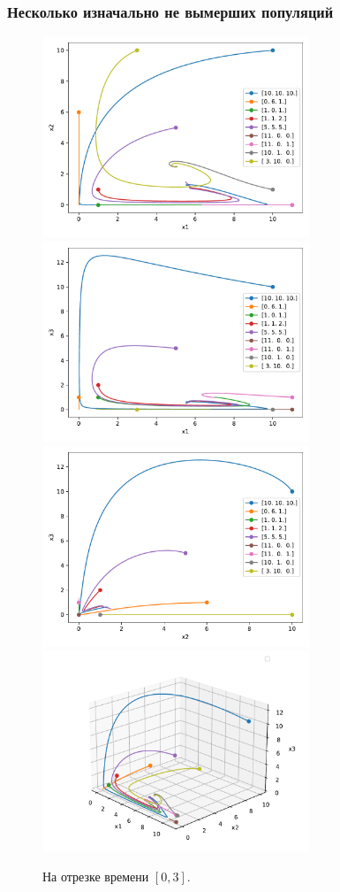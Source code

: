     \subsubsection{Несколько изначально не вымерших популяций}
    \begin{figure}[H]
        \centering
        \includegraphics[width=8cm]{pictures/kx_12phase.pdf}
        \includegraphics[width=8cm]{pictures/kx_13phase.pdf}
        \includegraphics[width=8cm]{pictures/kx_23phase.pdf}
        \includegraphics[width=8cm]{pictures/kx_phase3.pdf}
        \caption{На отрезке времени \( [0, 3] \).}
    \end{figure}
